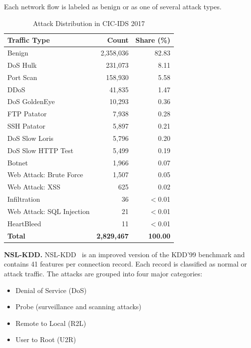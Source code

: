 \documentclass[a4paper,fleqn]{cas-sc}
\begin{document}
Each network flow is labeled as benign or as one of several attack types.
\begin{table}[htbp]
\caption{Attack Distribution in CIC-IDS 2017}\label{tab:attack_cic_2017}
\centering
\begin{tabular}{@{}lrr@{}}
\toprule
Traffic Type & Count & Share (\%) \\
\midrule
Benign                  & 2,358,036 & 82.83 \\
DoS Hulk                &   231,073 &  8.11 \\
Port Scan               &   158,930 &  5.58 \\
DDoS                    &    41,835 &  1.47 \\
DoS GoldenEye           &    10,293 &  0.36 \\
FTP Patator             &     7,938 &  0.28 \\
SSH Patator             &     5,897 &  0.21 \\
DoS Slow Loris          &     5,796 &  0.20 \\
DoS Slow HTTP Test      &     5,499 &  0.19 \\
Botnet                  &     1,966 &  0.07 \\
Web Attack: Brute Force &     1,507 &  0.05 \\
Web Attack: XSS         &       625 &  0.02 \\
Infiltration            &        36 & $<$0.01 \\
Web Attack: SQL Injection &      21 & $<$0.01 \\
HeartBleed              &        11 & $<$0.01 \\
\midrule
\textbf{Total}          & \textbf{2,829,467} & \textbf{100.00} \\
\bottomrule
\end{tabular}
\end{table}

\textbf{NSL-KDD.} NSL-KDD~\cite{bib21,bib30} is an improved version of the KDD'99 benchmark and contains 41 features per connection record. Each record is classified as normal or attack traffic. The attacks are grouped into four major categories:
\begin{itemize}
\item Denial of Service (DoS)
\item Probe (surveillance and scanning attacks)
\item Remote to Local (R2L)
\item User to Root (U2R)
\end{itemize}
\end{document}
